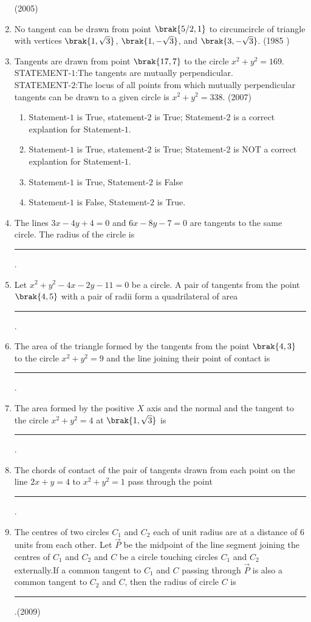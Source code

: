 \begin{enumerate}
	           \hfill(2005) 
    \item No tangent can be drawn from point $\brak{5/2,  1}$ to circumcircle of triangle with vertices $\brak{1,  \sqrt{3}}$,  $\brak{1,  -\sqrt{3}}$,  and $\brak{3,  -\sqrt{3}}$.
    \hfill{(1985 )}
\item Tangents are drawn from point $\brak{17,  7}$ to the circle $x^2+y^2=169$.\\
STATEMENT-$1$:The tangents are mutually perpendicular.\\
STATEMENT-$2$:The locus of all points from which mutually perpendicular tangents can be drawn to a given circle is $x^2+y^2=338$. \hfill(2007)
\begin{multicols}{2}
\begin{enumerate}
\item Statement-$1$ is True, statement-$2$ is True; Statement-$2$ is a correct explantion for Statement-$1$.
\item Statement-$1$ is True, statement-$2$ is True; Statement-$2$ is NOT a correct explantion for Statement-$1$.
\item Statement-$1$ is True,  Statement-$2$ is False
\item Statement-$1$ is False,  Statement-$2$ is True.
\end{enumerate}
\end{multicols}
%
\item The lines $3x-4y+4=0$ and $6x-8y-7=0$ are tangents to the same circle. The radius of the circle is \rule{1cm}{0.01pt}.
	\hfill{}
\item Let $x^{2}+y^{2}-4x-2y-11=0$ be a circle. A pair of tangents from the point $\brak{4, 5}$ with a pair of radii form a quadrilateral of area
\rule{1cm}{0.01pt}.
%
	\hfill{}
\item The area of the triangle formed by the tangents from the point $\brak{4, 3}$ to the circle $x^{2}+y^{2}=9$ and the line joining their point of contact is
\rule{1cm}{0.01pt}.
%
	\hfill{}
\item The area formed by the positive $X$ axis and the normal and the tangent to the circle $x^{2}+y^{2}=4$ at $\brak{1, \sqrt{3}}$ is
\rule{1cm}{0.01pt}.
%
	\hfill{}
\item The chords of contact of the pair of tangents drawn from each point on the line $2x+y=4$ to $x^{2}+y^{2}=1$ pass through the point \rule{1cm}{0.01pt}.
%
	\hfill{}
\item The centres of two circles $C_1$ and $C_2$ each of unit radius are at a distance of $6$ units from each other. Let $\vec{P}$ be the midpoint of the line segment joining the centres of $C_1$ and $C_2$ and $C$ be a circle touching circles $C_1$ and $C_2$ externally.If a common tangent to $C_1$ and $C$ passing through $\vec{P}$ is also a common tangent to $C_2$ and $C$,  then the radius of circle $C$ is  \rule{1cm}{0.01pt}.\hfill(2009)

\end{enumerate}
